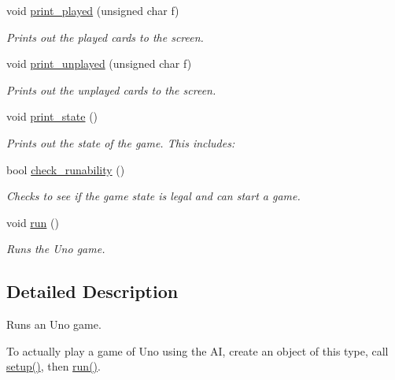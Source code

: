 \begin{DoxyCompactItemize}
void \hyperlink{class_uno___runner_a885e7ac58c656e1cb0bc4e49cd494874}{print\-\_\-played} (unsigned char f)
\begin{DoxyCompactList}\small\item\em \-Prints out the played cards to the screen. \end{DoxyCompactList}\item 
void \hyperlink{class_uno___runner_a53b830015937722abd8ec515405534f9}{print\-\_\-unplayed} (unsigned char f)
\begin{DoxyCompactList}\small\item\em \-Prints out the unplayed cards to the screen. \end{DoxyCompactList}\item 
void \hyperlink{class_uno___runner_a2d16089c5bdf20c1120be067797a349a}{print\-\_\-state} ()
\begin{DoxyCompactList}\small\item\em \-Prints out the state of the game. \-This includes\-: \end{DoxyCompactList}\item 
bool \hyperlink{class_uno___runner_a876150bbc2a8aeadb3343681fb841c80}{check\-\_\-runability} ()
\begin{DoxyCompactList}\small\item\em \-Checks to see if the game state is legal and can start a game. \end{DoxyCompactList}\item 
void \hyperlink{class_uno___runner_a3f0847989a9868bcd023b41ee5f28d0a}{run} ()
\begin{DoxyCompactList}\small\item\em \-Runs the \-Uno game. \end{DoxyCompactList}\end{DoxyCompactItemize}


\subsection{\-Detailed \-Description}
\-Runs an \-Uno game. 

\-To actually play a game of \-Uno using the \-A\-I, create an object of this type, call \hyperlink{class_uno___runner_ae015517f7d4493ddbaaeacd98be0b9b8}{setup()}, then \hyperlink{class_uno___runner_a3f0847989a9868bcd023b41ee5f28d0a}{run()}. 

